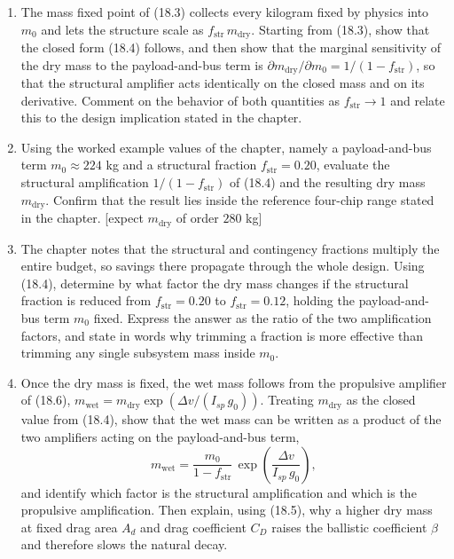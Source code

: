 \documentclass[
  11pt,
  openany,
  oneside]{book}
\begin{document}
\begin{enumerate}
\def\labelenumi{\arabic{enumi}.}
\item
  The mass fixed point of (18.3) collects every kilogram fixed by
  physics into \(m_0\) and lets the structure scale as
  \(f_{\mathrm{str}}\,m_{\mathrm{dry}}\). Starting from (18.3), show
  that the closed form (18.4) follows, and then show that the marginal
  sensitivity of the dry mass to the payload-and-bus term is
  \(\partial m_{\mathrm{dry}} / \partial m_0 = 1/(1 - f_{\mathrm{str}})\),
  so that the structural amplifier acts identically on the closed mass
  and on its derivative. Comment on the behavior of both quantities as
  \(f_{\mathrm{str}} \to 1\) and relate this to the design implication
  stated in the chapter.
\item
  Using the worked example values of the chapter, namely a
  payload-and-bus term \(m_0 \approx 224\) kg and a structural fraction
  \(f_{\mathrm{str}} = 0.20\), evaluate the structural amplification
  \(1/(1 - f_{\mathrm{str}})\) of (18.4) and the resulting dry mass
  \(m_{\mathrm{dry}}\). Confirm that the result lies inside the
  reference four-chip range stated in the chapter. {[}expect
  \(m_{\mathrm{dry}}\) of order \(280\) kg{]}
\item
  The chapter notes that the structural and contingency fractions
  multiply the entire budget, so savings there propagate through the
  whole design. Using (18.4), determine by what factor the dry mass
  changes if the structural fraction is reduced from
  \(f_{\mathrm{str}} = 0.20\) to \(f_{\mathrm{str}} = 0.12\), holding
  the payload-and-bus term \(m_0\) fixed. Express the answer as the
  ratio of the two amplification factors, and state in words why
  trimming a fraction is more effective than trimming any single
  subsystem mass inside \(m_0\).
\item
  Once the dry mass is fixed, the wet mass follows from the propulsive
  amplifier of (18.6),
  \(m_{\mathrm{wet}} = m_{\mathrm{dry}}\exp\!\left(\Delta v / (I_{sp}\,g_0)\right)\).
  Treating \(m_{\mathrm{dry}}\) as the closed value from (18.4), show
  that the wet mass can be written as a product of the two amplifiers
  acting on the payload-and-bus term,
  \[ m_{\mathrm{wet}} = \frac{m_0}{1 - f_{\mathrm{str}}}\,\exp\!\left(\frac{\Delta v}{I_{sp}\,g_0}\right), \]
  and identify which factor is the structural amplification and which is
  the propulsive amplification. Then explain, using (18.5), why a higher
  dry mass at fixed drag area \(A_d\) and drag coefficient \(C_D\)
  raises the ballistic coefficient \(\beta\) and therefore slows the
  natural decay.
\end{enumerate}
\end{document}
